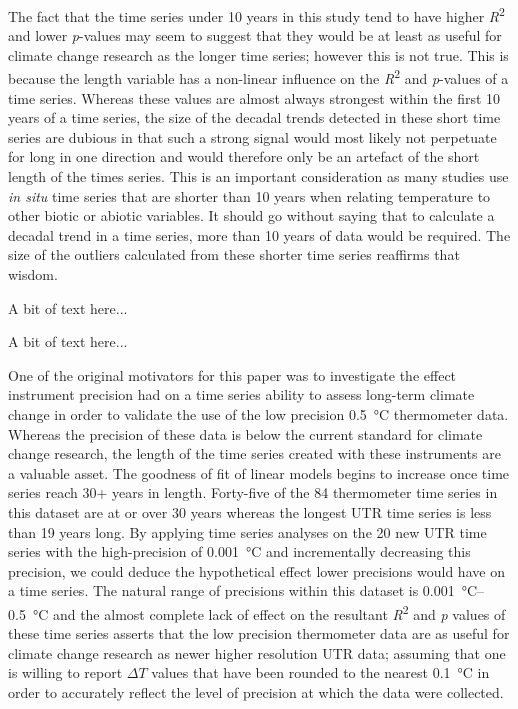\documentclass{ametsoc}
\begin{document}
The fact that the time series under 10 years in this study tend to have higher \emph{R}\textsuperscript{2} and lower \emph{p}-values may seem to suggest that they would be at least as useful for climate change research as the longer time series; however this is not true. This is because the length variable has a non-linear influence on the \emph{R}\textsuperscript{2} and \emph{p}-values of a time series. Whereas these values are almost always strongest within the first 10 years of a time series, the size of the decadal trends detected in these short time series are dubious in that such a strong signal would most likely not perpetuate for long in one direction and would therefore only be an artefact of the short length of the times series. This is an important consideration as many studies use \emph{in situ} time series that are shorter than 10 years when relating temperature to other biotic or abiotic variables. It should go without saying that to calculate a decadal trend in a time series, more than 10 years of data would be required. The size of the outliers calculated from these shorter time series reaffirms that wisdom.

A bit of text here...

A bit of text here...

One of the original motivators for this paper was to investigate the effect instrument precision had on a time series ability to assess long-term climate change in order to validate the use of the low precision \SI{0.5}{\degreeCelsius} thermometer data. Whereas the precision of these data is below the current standard for climate change research, the length of the time series created with these instruments are a valuable asset. The goodness of fit of linear models begins to increase once time series reach 30+ years in length. Forty-five of the 84 thermometer time series in this dataset are at or over 30 years whereas the longest UTR time series is less than 19 years long. By applying time series analyses on the 20 new UTR time series with the high-precision of \SI{0.001}{\degreeCelsius} and incrementally decreasing this precision, we could deduce the hypothetical effect lower precisions would have on a time series. The natural range of precisions within this dataset is \SIrange{0.001}{0.5}{\degreeCelsius} and the almost complete lack of effect on the resultant \emph{R}\textsuperscript{2} and \emph{p} values of these time series asserts that the low precision thermometer data are as useful for climate change research as newer higher resolution UTR data; assuming that one is willing to report $\Delta T$ values that have been rounded to the nearest \SI{0.1}{\degreeCelsius} in order to accurately reflect the level of precision at which the data were collected.
\end{document}
